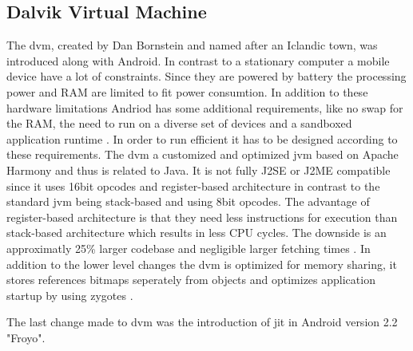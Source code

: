 \subsection{Dalvik Virtual Machine} \label{subsection:android-dalvik}
The \gls{dvm}, created by Dan Bornstein and named after an Iclandic town, was introduced along with Android.
\newline
In contrast to a stationary computer a mobile device have a lot of constraints.
Since they are powered by battery the processing power and RAM are limited to fit power consumtion.
In addition to these hardware limitations Andriod has some additional requirements, like no swap for the RAM, the need to run on a diverse set of devices and a sandboxed application runtime .
In order to run efficient it has to be designed according to these requirements.
The \gls{dvm} a customized and optimized \gls{jvm} based on Apache Harmony and thus is related to Java.
It is not fully J2SE or J2ME compatible since it uses 16bit opcodes and register-based architecture in contrast to the standard \gls{jvm} being stack-based and using 8bit opcodes.
The advantage of register-based architecture is that they need less instructions for execution than stack-based architecture which results in less CPU cycles.
The downside is an approximatly 25\% larger codebase and negligible larger fetching times \cite{ehringerDalvik}.
In addition to the lower level changes the \gls{dvm} is optimized for memory sharing, it stores references bitmaps seperately from objects and optimizes application startup by using zygotes \cite{andevconDalvikART}.
\newline

The last change made to \gls{dvm} was the introduction of \gls{jit} in Android version 2.2 "Froyo".





